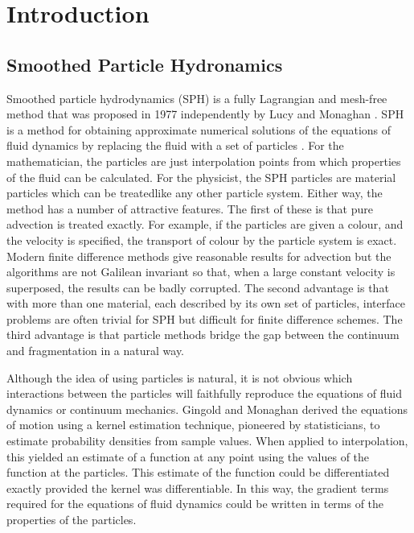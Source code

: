 
\chapter{Introduction}
\label{chap:chapter_1}

\section{Smoothed Particle Hydronamics}
\label{sec:section_1}

Smoothed particle hydrodynamics (SPH) is a fully Lagrangian and mesh-free method that was proposed in 1977 independently by Lucy \cite{lucy_numerical_1977} and 
Monaghan \cite{gingold_smoothed_1977}. SPH is a method for obtaining approximate numerical solutions of the equations of fluid dynamics by replacing the fluid with a set of 
particles \cite{monaghan_smoothed_2005}. For the mathematician, the particles are just interpolation points from which properties of the fluid
can be calculated. For the physicist, the SPH particles are material particles which can be treatedlike any other particle system. Either way, the method has a number of attractive 
features. The first of these is that pure advection is treated exactly. For example, if the particles are given a colour, and the velocity is specified, the transport of colour by 
the particle system is exact. Modern finite difference methods give reasonable results for advection but the algorithms are not Galilean invariant so that, when a large constant 
velocity is superposed, the results can be badly corrupted. The second advantage is that with more than one material, each described by its own set of particles, interface problems 
are often trivial for SPH but difficult for finite difference schemes. The third advantage is that particle methods bridge the gap between the continuum and fragmentation in a 
natural way.\par

Although the idea of using particles is natural, it is not obvious which interactions between the particles will faithfully reproduce the equations of fluid dynamics or continuum
mechanics. Gingold and Monaghan \cite{gingold_smoothed_1977} derived the equations of motion using a kernel estimation technique, pioneered by statisticians, to estimate probability 
densities from sample values. When applied to interpolation, this yielded an estimate of a function at any point using the values of the function at the particles. This estimate of 
the function could be differentiated exactly provided the kernel was differentiable. In this way, the gradient terms required for the equations of fluid dynamics could be written in
terms of the properties of the particles.\par


